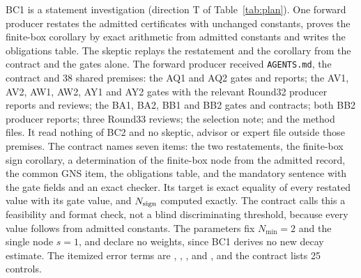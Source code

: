 BC1 is a statement investigation (direction T of Table~\ref{tab:plan}). One
forward producer restates the admitted certificates with unchanged
constants, proves the finite-box corollary by exact arithmetic from admitted
constants and writes the obligations table. The skeptic replays the
restatement and the corollary from the contract and the gates alone. The
forward producer received \texttt{AGENTS.md}, the contract and 38 shared
premises: the AQ1 and AQ2 gates and reports; the AV1, AV2, AW1, AW2, AY1 and
AY2 gates with the relevant Round32 producer reports and reviews; the BA1,
BA2, BB1 and BB2 gates and contracts; both BB2 producer reports; three Round33
reviews; the selection note; and the method files. It read nothing of BC2
and no skeptic, advisor or expert file outside those premises. The contract names seven items: the
two restatements, the finite-box sign corollary, a determination of the
finite-box node from the admitted record, the common GNS item, the
obligations table, and the mandatory sentence with the gate fields and an
exact checker. Its target is exact equality of every restated value with its
gate value, and $N_{\rm sign}$ computed exactly. The contract calls this a
feasibility and format check, not a blind discriminating threshold, because
every value follows from admitted constants. The parameters fix $N_{\min}=2$
and the single node $s=1$, and declare no weights, since BC1 derives no new
decay estimate. The itemized error terms are
, ,
, 
and , and the contract lists 25 controls.

